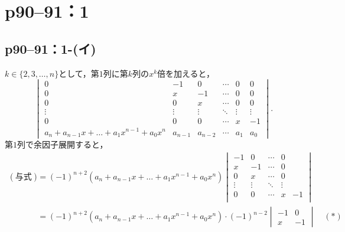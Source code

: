 \section*{p90--91：1}


\subsection*{p90--91：1-(イ)}

\begin{tanswer}
  $ k \in \{ 2,3 ,\ldots,n \}$として，第$1$列に第$k$列の$x^k$倍を加えると，
  \[
    \begin{vmatrix}
      0                                              & -1      & 0       & \cdots & 0      & 0      \\
      0                                              & x       & -1      & \cdots & 0      & 0      \\
      0                                              & 0       & x       & \cdots & 0      & 0      \\
      \vdots                                         & \vdots  & \vdots  & \ddots & \vdots & \vdots \\
      0                                              & 0       & 0       & \cdots & x      & -1     \\
      a_n + a_{n-1} x + \dots +a_1 x^{n-1} + a_0 x^n & a_{n-1} & a_{n-2} & \cdots & a_1    & a_0
    \end{vmatrix}.
  \]
  第$1$列で余因子展開すると，
  \begin{align*}
    (\text{与式}) & = (-1)^{n+2} (a_n + a_{n-1} x + \dots +a_1 x^{n-1} + a_0 x^n)
    \begin{vmatrix}
      -1     & 0      & \cdots & 0           \\
      x      & -1     & \cdots & 0           \\
      0      & x      & \cdots & 0           \\
      \vdots & \vdots & \ddots & \vdots &    \\
      0      & 0      & \cdots & x      & -1 \\
    \end{vmatrix}                                                                                                                           \\
                & = (-1)^{n+2}(a_n + a_{n-1} x + \dots +a_1 x^{n-1} + a_0 x^n) \cdot (-1)^{n-2} \begin{vmatrix} -1 & 0 \\ x & -1 \end{vmatrix} \quad (\text{$\ast$}) \\

\end{align*}
\end{tanswer}
